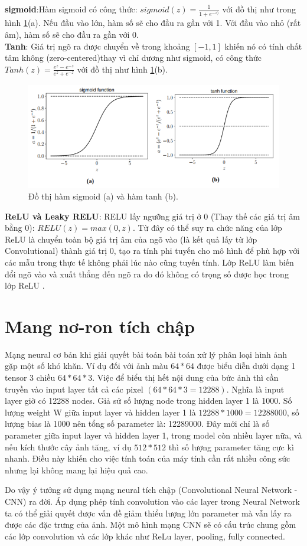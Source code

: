 \tab \textbf{sigmoid}:Hàm sigmoid có công thức: $sigmoid(z)= \frac{1}{1+e^{-z)}}$ với đồ thị như trong hình \ref{fig:neural2}(a). Nếu đầu vào lớn, hàm số sẽ cho đầu ra gần với 1. Với đầu vào nhỏ (rất âm), hàm số sẽ cho đầu ra gần với 0.\\
\tab \textbf{Tanh}: Giá trị ngõ ra được chuyển về trong khoảng $[-1,1]$ khiến nó có tính chất tâm không (zero-centered)thay vì chỉ dương như sigmoid, có công thức $Tanh(z)=\frac{e^{z}-e^{-z}}{e^z+e^{-z}}$ với đồ thị như hình \ref{fig:neural2}(b).\par
\begin{figure}[ht!]
\centerline{\includegraphics[scale=0.7]{images/neural2.png}}
\caption{Đồ thị hàm sigmoid (a) và hàm tanh (b)\cite{ntt:2019}.}
\label{fig:neural2}
\end{figure}
\noindent\tab\textbf{ReLU và Leaky RELU}: RELU lấy ngưỡng giá trị ở 0 (Thay thế các giá trị âm bằng 0): $RELU(z)= max(0,z)$. Từ đây có thể suy ra chức năng của lớp ReLU là chuyển toàn bộ giá trị âm của ngõ vào (là kết quả lấy từ lớp Convolutional) thành giá trị 0, tạo ra tính phi tuyến cho mô hình để phù hợp với các mẫu trong thực tế không phải lúc nào cũng tuyến tính. Lớp ReLU làm biến đổi ngõ vào và xuất thẳng đến ngõ ra do đó không có trọng số được học trong lớp ReLU \cite{ntt:2019}.
\section{Mang nơ-ron tích chập}
Mạng neural cơ bản khi giải quyết bài toán bài toán xử lý phân loại hình ảnh gặp một số khó khăn. Ví dụ đối với ảnh màu $64*64$ được biểu diễn dưới dạng 1 tensor 3 chiều $64*64*3$. Việc để biểu thị hết nội dung của bức ảnh thì cần truyền vào input layer tất cả các pixel $(64*64*3 = 12288)$. Nghĩa là input layer giờ có 12288 nodes. Giả sử số lượng node trong hidden layer 1 là 1000. Số lượng weight W giữa input layer và hidden layer 1 là $12288*1000 = 12288000$, số lượng bias là 1000 nên tổng số parameter là: 12289000. Đây mới chỉ là số parameter giữa input layer và hidden layer 1, trong model còn nhiều layer nữa, và nếu kích thước cây ảnh tăng, ví dụ $512*512$ thì số lượng parameter tăng cực kì nhanh. Điều này khiến cho việc tính toán của máy tính cần rất nhiều công sức nhưng lại không mang lại hiệu quả cao. \par  
Do vậy ý tưởng sử dụng mạng neural tích chập (Convolutional Neural Network -CNN) ra đời. Áp dụng phép tính convolution vào các layer trong Neural Network ta có thể giải quyết được vấn đề giảm thiểu lượng lớn parameter mà vẫn lấy ra được các đặc trưng của ảnh. Một mô hình mạng CNN sẽ có cấu trúc chung gồm các lớp convolution và các lớp khác như ReLu layer, pooling, fully connected.\par
